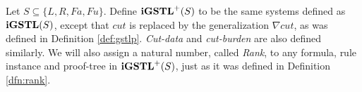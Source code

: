 \begin{dfn}[$\igstl^+$]\label{def:igstlp}
	Let $S \subseteq \{L, R, Fa, Fu\}$. Define $\mathbf{iGSTL}^+(S)$ to be the same systems defined as $\mathbf{iGSTL}(S)$, except that $cut$ is replaced by the generalization $\nabla cut$, as was defined in Definition \ref{def:gstlp}. \emph{Cut-data} and \emph{cut-burden} are also defined similarly. We will also assign a natural number, called \emph{Rank}, to any formula, rule instance and proof-tree in $\mathbf{iGSTL}^+(S)$, just as it was defined in Definition \ref{dfn:rank}.
\end{dfn}